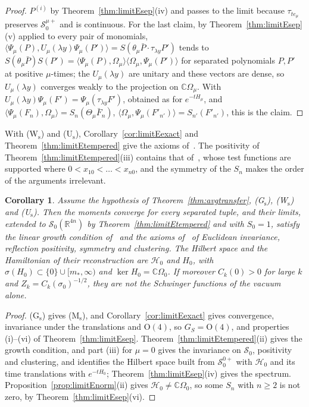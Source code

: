 \documentclass[aps,prd,twocolumn,superscriptaddress,nofootinbib,longbibliography,floatfix,amsmath,amssymb,10pt]{revtex4-2}
\newtheorem{corollary}[theorem]{Corollary}
\theoremstyle{definition}
\theoremstyle{remark}
\newcommand{\R}{\mathbb{R}}
\newcommand{\C}{\mathbb{C}}
\newcommand{\ip}[2]{\langle #1,#2\rangle}
\begin{document}
\begin{proof}
$P^{(i)}$ by Theorem~\ref{thm:limitEsep}(iv) and passes to the limit because
$\tau_{te_\mu}$ preserves $\mathcal S^{\mu+}_0$ and is continuous. For the
last claim, by Theorem~\ref{thm:limitEsep}(v) applied to every pair of
monomials, $\ip{\Psi_\mu(P)}{U_\mu(\lambda y)\Psi_\mu(P')}=S(\theta_\mu\bar
P\cdot\tau_{\lambda y}P')$ tends to $S(\theta_\mu\bar P)S(P')=\ip{\Psi_\mu(P)}
{\Omega_\mu}\ip{\Omega_\mu}{\Psi_\mu(P')}$ for separated polynomials $P,P'$ at
positive $\mu$-times; the $U_\mu(\lambda y)$ are unitary and these vectors
are dense, so $U_\mu(\lambda y)$ converges weakly to the projection on
$\C\Omega_\mu$. With $U_\mu(\lambda y)\Psi_\mu(F')=\Psi_\mu(\tau_{\lambda
y}F')$, obtained as for $e^{-tH_\mu}$, and $\ip{\Psi_\mu(F_n)}{\Omega_\mu}=
S_n(\Theta_\mu\bar F_n)$, $\ip{\Omega_\mu}{\Psi_\mu(F'_{n'})}=S_{n'}(F'_{n'})$,
this is the claim.
\end{proof}

With (W$_{\mathrm s}$) and (U$_{\mathrm s}$),
Corollary~\ref{cor:limitEexact} and Theorem~\ref{thm:limitEtempered} give the
axioms of~\cite{OS73,OS75}. The positivity of
Theorem~\ref{thm:limitEtempered}(iii) contains that of~\cite{OS73}, whose test
functions are supported where $0<x_{10}<\dots<x_{n0}$, and the symmetry of the
$S_n$ makes the order of the arguments irrelevant.

\begin{corollary}\label{cor:limitEOS}
Assume the hypothesis of Theorem~\textup{\ref{thm:avgtransfer}},
\textup{(G$_{\mathrm s}$)}, \textup{(W$_{\mathrm s}$)} and
\textup{(U$_{\mathrm s}$)}. Then the moments converge for every separated
tuple, and their limits, extended to $\mathcal S_0(\R^{4n})$ by
Theorem~\textup{\ref{thm:limitEtempered}} and with $S_0=1$, satisfy the linear
growth condition of~\cite{OS75} and the axioms of~\cite{OS73} of Euclidean
invariance, reflection positivity, symmetry and clustering. The Hilbert space
and the Hamiltonian of their reconstruction are $\mathcal H_0$ and $H_0$, with
$\sigma(H_0)\subset\{0\}\cup[m_*,\infty)$ and $\ker H_0=\C\Omega_0$. If
moreover $C_k(0)>0$ for large $k$ and $Z_k=C_k(\sigma_0)^{-1/2}$, they are not
the Schwinger functions of the vacuum alone.
\end{corollary}

\begin{proof}
(G$_{\mathrm s}$) gives (M$_{\mathrm s}$), and Corollary~\ref{cor:limitEexact}
gives convergence, invariance under the translations and $\mathrm O(4)$, so
$G_S=\mathrm O(4)$, and properties (i)--(vi) of
Theorem~\ref{thm:limitEsep}. Theorem~\ref{thm:limitEtempered}(ii) gives the
growth condition, and part (iii) for $\mu=0$ gives the invariance on
$\mathcal S_0$, positivity and clustering, and identifies the Hilbert space
built from $\mathcal S^{0+}_0$ with $\mathcal H_0$ and its time translations
with $e^{-tH_0}$; Theorem~\ref{thm:limitEsep}(iv) gives the spectrum.
Proposition~\ref{prop:limitEnorm}(ii) gives $\mathcal H_0\ne\C\Omega_0$, so
some $S_n$ with $n\ge2$ is not zero, by Theorem~\ref{thm:limitEsep}(vi).
\end{proof}
\end{document}
